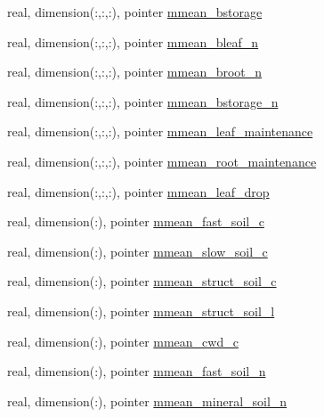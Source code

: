 \begin{DoxyCompactItemize}
\item 
real, dimension(\+:,\+:,\+:), pointer \hyperlink{structed__state__vars_1_1edtype_ae21373a5b86546b31c9bfdc88fb818bb}{mmean\+\_\+bstorage}
\item 
real, dimension(\+:,\+:,\+:), pointer \hyperlink{structed__state__vars_1_1edtype_a81de9795c1996c14842c378f67cafd3b}{mmean\+\_\+bleaf\+\_\+n}
\item 
real, dimension(\+:,\+:,\+:), pointer \hyperlink{structed__state__vars_1_1edtype_ac861a215b0cc5e0ee0feb07463fedb49}{mmean\+\_\+broot\+\_\+n}
\item 
real, dimension(\+:,\+:,\+:), pointer \hyperlink{structed__state__vars_1_1edtype_a617ae138b47f78cadc061903d38d6d43}{mmean\+\_\+bstorage\+\_\+n}
\item 
real, dimension(\+:,\+:,\+:), pointer \hyperlink{structed__state__vars_1_1edtype_ad4db262d46807d11b4596a3d5e300b47}{mmean\+\_\+leaf\+\_\+maintenance}
\item 
real, dimension(\+:,\+:,\+:), pointer \hyperlink{structed__state__vars_1_1edtype_a425b08c8723181a17b8b6f89cea78ff1}{mmean\+\_\+root\+\_\+maintenance}
\item 
real, dimension(\+:,\+:,\+:), pointer \hyperlink{structed__state__vars_1_1edtype_a8ac54d62621a53eb651cfa2f6d847b5d}{mmean\+\_\+leaf\+\_\+drop}
\item 
real, dimension(\+:), pointer \hyperlink{structed__state__vars_1_1edtype_ab3b05471f9e414ce51b3c13a27cfcce2}{mmean\+\_\+fast\+\_\+soil\+\_\+c}
\item 
real, dimension(\+:), pointer \hyperlink{structed__state__vars_1_1edtype_a082346847c7907f1b28100e1f1cbf7f6}{mmean\+\_\+slow\+\_\+soil\+\_\+c}
\item 
real, dimension(\+:), pointer \hyperlink{structed__state__vars_1_1edtype_abbfe1044449312112331c258615ca512}{mmean\+\_\+struct\+\_\+soil\+\_\+c}
\item 
real, dimension(\+:), pointer \hyperlink{structed__state__vars_1_1edtype_a844b16b3a89f42b5a190e80f79b03613}{mmean\+\_\+struct\+\_\+soil\+\_\+l}
\item 
real, dimension(\+:), pointer \hyperlink{structed__state__vars_1_1edtype_aecb78a23db7da5d572377dbb2c08b6c5}{mmean\+\_\+cwd\+\_\+c}
\item 
real, dimension(\+:), pointer \hyperlink{structed__state__vars_1_1edtype_a96c88adcb6108d1935055c871ac728cd}{mmean\+\_\+fast\+\_\+soil\+\_\+n}
\item 
real, dimension(\+:), pointer \hyperlink{structed__state__vars_1_1edtype_ab6489e33da00f53491c75338795fc6c4}{mmean\+\_\+mineral\+\_\+soil\+\_\+n}

\end{DoxyCompactItemize}
